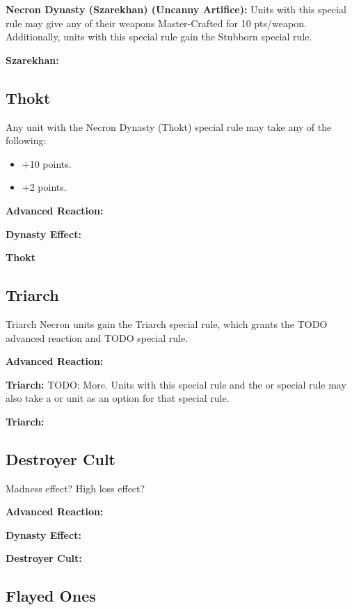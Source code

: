 \begin{multicols}{2}
\textbf{Necron Dynasty (Szarekhan) (Uncanny Artifice):} Units with this special rule may give any of their weapons Master-Crafted for 10 pts/weapon. Additionally, units with this special rule gain the Stubborn special rule.

\textbf{Szarekhan:}


\newpage
\subsection{Thokt}

Any unit with the Necron Dynasty (Thokt) special rule may take any of the following:
\begin{itemize}
	\item {} \dotfill +10 points.
	\item {} \dotfill +2 points.
\end{itemize}

\textbf{Advanced Reaction:}

\textbf{Dynasty Effect:} 

\textbf{Thokt}


\newpage
\subsection{Triarch}

Triarch Necron units gain the Triarch special rule, which grants the TODO advanced reaction and TODO special rule.

\textbf{Advanced Reaction:}

\textbf{Triarch:} TODO: More. Units with this special rule and the  or  special rule may also take a  or  unit as an option for that special rule.

\textbf{Triarch:}


\newpage
\subsection{Destroyer Cult}

Madness effect? High loss effect?

\textbf{Advanced Reaction:}

\textbf{Dynasty Effect:}

\textbf{Destroyer Cult:}


\newpage
\subsection{Flayed Ones}


\end{multicols}

